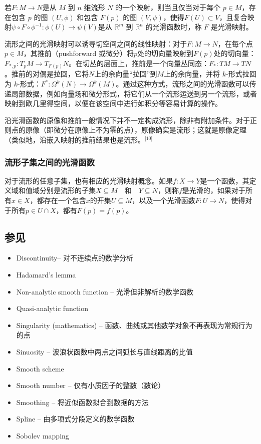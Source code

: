 若$F: M \to N$是从 $M$ 到 $n$ 维流形 $N$ 的一个映射，则当且仅当对于每个 $p \in M$，存在包含 $p$ 的图 $(U, \phi)$ 和包含 $F(p)$ 的图 $(V, \psi)$，使得$F(U) \subset V$，且复合映射$\psi \circ F \circ \phi^{-1} : \phi(U) \to \psi(V)$是从 $\mathbb{R}^m$ 到 $\mathbb{R}^n$ 的光滑函数时，称 $F$ 是光滑映射。

流形之间的光滑映射可以诱导切空间之间的线性映射：对于$F: M \to N$，在每个点 $p \in M$，其推前（pushforward 或微分）将$p$处的切向量映射到$F(p)$处的切向量：$F_{*,p}: T_p M \to T_{F(p)} N$。在切丛的层面上，推前是一个向量丛同态：$F_*: TM \to TN$。推前的对偶是拉回，它将$N$上的余向量“拉回”到$M$上的余向量，并将 $k$-形式拉回为 $k$-形式：$F^*: \Omega^k(N) \to \Omega^k(M)$。通过这种方式，流形之间的光滑函数可以传递局部数据，例如向量场和微分形式，将它们从一个流形运送到另一个流形，或者映射到欧几里得空间，以便在该空间中进行如积分等容易计算的操作。

沿光滑函数的原像和推前一般情况下并不一定构成流形，除非有附加条件。对于正则点的原像（即微分在原像上不为零的点），原像确实是流形；这就是原像定理（类似地，沿嵌入映射的推前结果也是流形。\(^\text{[10]}\)
\subsubsection{流形子集之间的光滑函数}
对于流形的任意子集，也有相应的光滑映射概念。如果$f: X \to Y$是一个函数，其定义域和值域分别是流形的子集$X \subseteq M\quad \text{和} \quad Y \subseteq N$，则称$f$是光滑的，如果对于所有$x \in X$，都存在一个包含$x$的开集$U \subseteq M$，以及一个光滑函数$F: U \to N$，使得对于所有$p \in U \cap X$，都有$F(p) = f(p)$。
\subsection{参见}
\begin{itemize}
\item Discontinuity– 对不连续点的数学分析
\item Hadamard's lemma
\item Non-analytic smooth function – 光滑但非解析的数学函数
\item Quasi-analytic function
\item Singularity (mathematics) – 函数、曲线或其他数学对象不再表现为常规行为的点
\item Sinuosity – 波浪状函数中两点之间弧长与直线距离的比值
\item Smooth scheme
\item Smooth number – 仅有小质因子的整数（数论）
\item Smoothing – 将近似函数拟合到数据的方法
\item Spline – 由多项式分段定义的数学函数
\item Sobolev mapping
\end{itemize}
